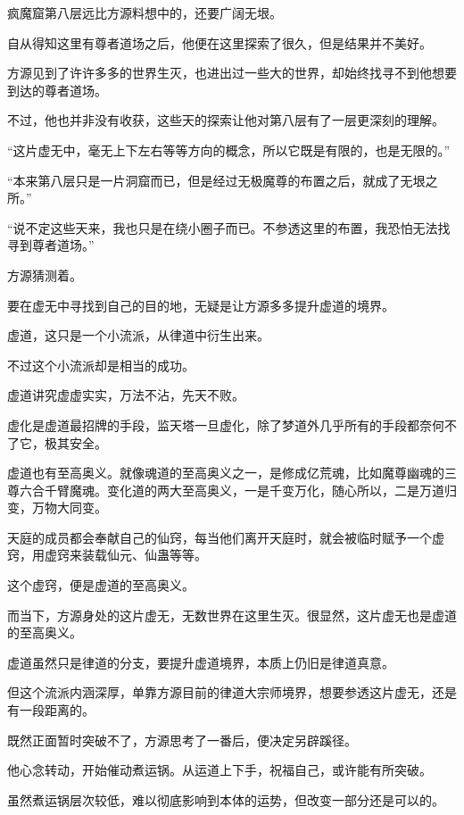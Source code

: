 
\begin{this_body}

疯魔窟第八层远比方源料想中的，还要广阔无垠。

自从得知这里有尊者道场之后，他便在这里探索了很久，但是结果并不美好。

方源见到了许许多多的世界生灭，也进出过一些大的世界，却始终找寻不到他想要到达的尊者道场。

不过，他也并非没有收获，这些天的探索让他对第八层有了一层更深刻的理解。

“这片虚无中，毫无上下左右等等方向的概念，所以它既是有限的，也是无限的。”

“本来第八层只是一片洞窟而已，但是经过无极魔尊的布置之后，就成了无垠之所。”

“说不定这些天来，我也只是在绕小圈子而已。不参透这里的布置，我恐怕无法找寻到尊者道场。”

方源猜测着。

要在虚无中寻找到自己的目的地，无疑是让方源多多提升虚道的境界。

虚道，这只是一个小流派，从律道中衍生出来。

不过这个小流派却是相当的成功。

虚道讲究虚虚实实，万法不沾，先天不败。

虚化是虚道最招牌的手段，监天塔一旦虚化，除了梦道外几乎所有的手段都奈何不了它，极其安全。

虚道也有至高奥义。就像魂道的至高奥义之一，是修成亿荒魂，比如魔尊幽魂的三尊六合千臂魔魂。变化道的两大至高奥义，一是千变万化，随心所以，二是万道归变，万物大同变。

天庭的成员都会奉献自己的仙窍，每当他们离开天庭时，就会被临时赋予一个虚窍，用虚窍来装载仙元、仙蛊等等。

这个虚窍，便是虚道的至高奥义。

而当下，方源身处的这片虚无，无数世界在这里生灭。很显然，这片虚无也是虚道的至高奥义。

虚道虽然只是律道的分支，要提升虚道境界，本质上仍旧是律道真意。

但这个流派内涵深厚，单靠方源目前的律道大宗师境界，想要参透这片虚无，还是有一段距离的。

既然正面暂时突破不了，方源思考了一番后，便决定另辟蹊径。

他心念转动，开始催动煮运锅。从运道上下手，祝福自己，或许能有所突破。

虽然煮运锅层次较低，难以彻底影响到本体的运势，但改变一部分还是可以的。


\end{this_body}
